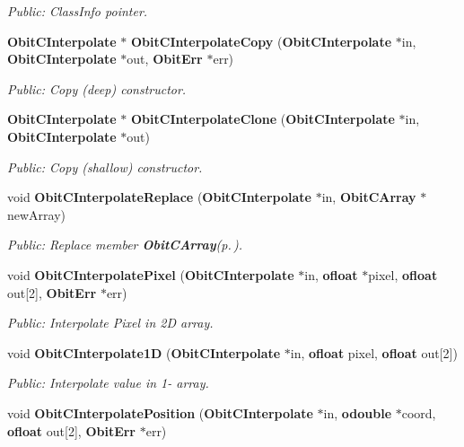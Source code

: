 \begin{CompactItemize}
\begin{CompactList}\small\item\em Public: Class\-Info pointer. \item\end{CompactList}\item 
{\bf Obit\-CInterpolate} $\ast$ {\bf Obit\-CInterpolate\-Copy} ({\bf Obit\-CInterpolate} $\ast$in, {\bf Obit\-CInterpolate} $\ast$out, {\bf Obit\-Err} $\ast$err)
\begin{CompactList}\small\item\em Public: Copy (deep) constructor. \item\end{CompactList}\item 
{\bf Obit\-CInterpolate} $\ast$ {\bf Obit\-CInterpolate\-Clone} ({\bf Obit\-CInterpolate} $\ast$in, {\bf Obit\-CInterpolate} $\ast$out)
\begin{CompactList}\small\item\em Public: Copy (shallow) constructor. \item\end{CompactList}\item 
void {\bf Obit\-CInterpolate\-Replace} ({\bf Obit\-CInterpolate} $\ast$in, {\bf Obit\-CArray} $\ast$new\-Array)
\begin{CompactList}\small\item\em Public: Replace member {\bf Obit\-CArray}{\rm (p.\,\pageref{structObitCArray})}. \item\end{CompactList}\item 
void {\bf Obit\-CInterpolate\-Pixel} ({\bf Obit\-CInterpolate} $\ast$in, {\bf ofloat} $\ast$pixel, {\bf ofloat} out[2], {\bf Obit\-Err} $\ast$err)
\begin{CompactList}\small\item\em Public: Interpolate Pixel in 2D array. \item\end{CompactList}\item 
void {\bf Obit\-CInterpolate1D} ({\bf Obit\-CInterpolate} $\ast$in, {\bf ofloat} pixel, {\bf ofloat} out[2])
\begin{CompactList}\small\item\em Public: Interpolate value in 1- array. \item\end{CompactList}\item 
void {\bf Obit\-CInterpolate\-Position} ({\bf Obit\-CInterpolate} $\ast$in, {\bf odouble} $\ast$coord, {\bf ofloat} out[2], {\bf Obit\-Err} $\ast$err)

\end{CompactItemize}

